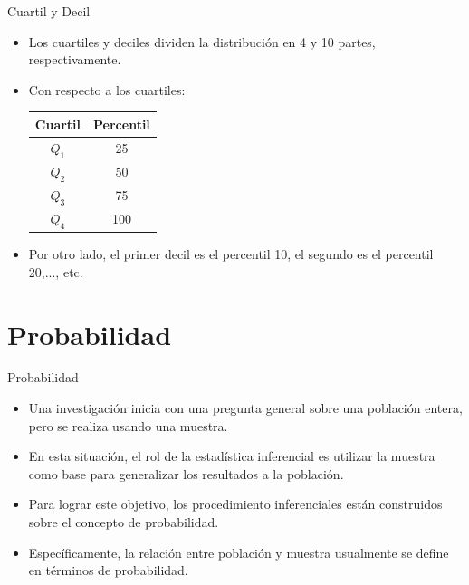 \documentclass[xcolor=dvipsnames]{beamer}
\begin{document}
\begin{frame}{Cuartil y Decil}
\begin{itemize}
\justifying
\item Los cuartiles y deciles dividen la distribución en 4 y 10 partes, respectivamente. 
\item Con respecto a los cuartiles:
\begin{center}
\begin{table}[H]
\begin{tabular}{cc} \hline
Cuartil & Percentil \\ \hline
$Q_1$ & 25 \\
$Q_2$ & 50 \\
$Q_3$ & 75 \\
$Q_4$ & 100 \\ \hline
\end{tabular}
\end{table}
\end{center}
\item Por otro lado, el primer decil es el percentil 10, el segundo es el percentil 20,..., etc.
\end{itemize}
\end{frame}
\section{Probabilidad}

\begin{frame}{Probabilidad}
\begin{itemize}
\justifying
\item Una investigación inicia con una pregunta general sobre una población entera, pero se realiza usando una muestra.
\item En esta situación, el rol de la estadística inferencial es utilizar la muestra como base para generalizar los resultados a la población.
\item Para lograr este objetivo, los procedimiento inferenciales están construidos sobre el concepto de probabilidad.
\item Específicamente, la relación entre población y muestra usualmente se define en términos de probabilidad.
\end{itemize}
\end{frame}
\end{document}
